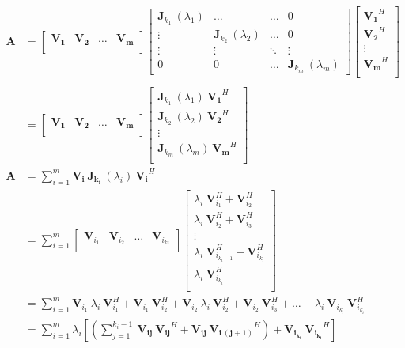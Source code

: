 \documentclass{scrreprt}
\begin{document}
\begin{align*}
\bm{A}&=
\begin{bmatrix}
\bm{V_1} & \bm{V_2} & \dots & \bm{V_m} \\ 
\end{bmatrix}
\begin{bmatrix}
\bm{J}_{k_1}\:(\lambda_1) & \dots & \dots & 0 \\
\vdots & \bm{J}_{k_2}\:(\lambda_2) & \dots & 0 \\
\vdots & \vdots & \ddots & \vdots \\
0 & 0 & \dots & \bm{J}_{k_m}\:(\lambda_m) 
\end{bmatrix}
\begin{bmatrix}
\bm{V_1}^H \\
\bm{V_2}^H \\
\vdots \\
\bm{V_m}^H \\
\end{bmatrix} \\
\\
&=
\begin{bmatrix}
\bm{V_1} & \bm{V_2} & \dots & \bm{V_m} \\ 
\end{bmatrix}
\begin{bmatrix}
\bm{J}_{k_1}\:(\lambda_1)\:\bm{V_1}^H \\
\bm{J}_{k_2}\:(\lambda_2)\:\bm{V_2}^H \\
\vdots \\
\bm{J}_{k_m}\:(\lambda_m)\:\bm{V_m}^H \\
\end{bmatrix}
\\
\bm{A} &= \sum_{i=1}^m \bm{V_i}\: \bm{J_{k_i}}\: (\lambda_i)\: \bm{V_i}^H \\
	&= \sum_{i=1}^m
	\begin{bmatrix}
	\bm{V}_{i_1} & \bm{V}_{i_2} & \dots & \bm{V}_{i_{ki}} \\ 
	\end{bmatrix}
	\begin{bmatrix}
	\lambda_i\:\bm{V}_{i_1}^H + \bm{V}_{i_2}^H \\
	\lambda_i\:\bm{V}_{i_2}^H  + \bm{V}_{i_3}^H  \\
	\vdots \\
	\lambda_i\:\bm{V}_{i_{k_i - 1}}^H  + \bm{V}_{i_{k_i}}^H \\
	\lambda_i\:\bm{V}_{i_{k_i}}^H \\
	\end{bmatrix} \\
	&= \sum_{i=1}^m \bm{V}_{i_1}\:\lambda_i\:\bm{V}_{i_1}^H  + \bm{V}_{i_1}\:\bm{V}_{i_2}^H + \bm{V}_{i_2}\:\lambda_i\:\bm{V}_{i_2}^H  + \bm{V}_{i_2}\:\bm{V}_{i_3}^H + \dots + \lambda_i\:\bm{V}_{i_{k_i}}\:\bm{V}_{i_{k_i}}^H \\
	&= \sum_{i=1}^m \lambda_i[(\sum_{j=1}^{k_i - 1}\: \bm{V_{ij}}\:\bm{V_{ij}}^H +  \bm{V_{ij}}\:\bm{V_{i\:(j+1)}}^H) +  \bm{V_{i_{k_i}}}\:\bm{V_{i_{k_i}}}^H]
\end{align*}
\end{document}
